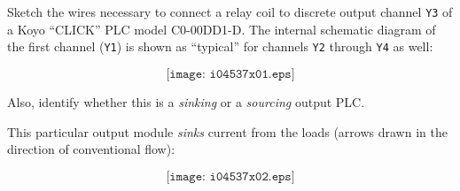 

Sketch the wires necessary to connect a relay coil to discrete output channel {\tt Y3} of a Koyo ``CLICK'' PLC model C0-00DD1-D.  The internal schematic diagram of the first channel ({\tt Y1}) is shown as ``typical'' for channels {\tt Y2} through {\tt Y4} as well:

$$\texttt{[image: i04537x01.eps]}$$

Also, identify whether this is a {\it sinking} or a {\it sourcing} output PLC.














This particular output module {\it sinks} current from the loads (arrows drawn in the direction of conventional flow):

$$\texttt{[image: i04537x02.eps]}$$




